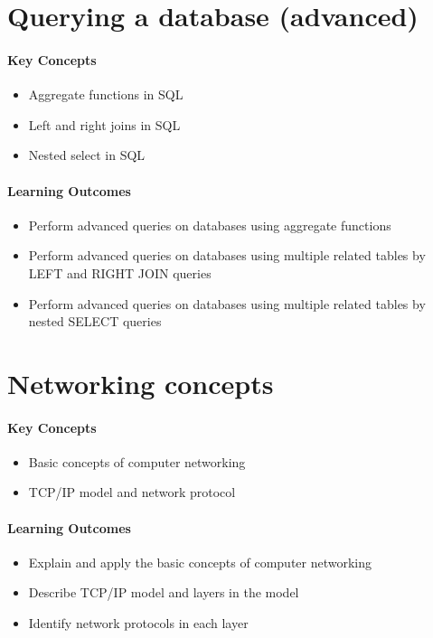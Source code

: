 \section{Querying a database (advanced)}

\begin{mdframed}

\paragraph{Key Concepts}
\begin{itemize}[label={\checkmark}]
\item Aggregate functions in SQL
\item Left and right joins in SQL
\item Nested select in SQL
\end{itemize}

\paragraph{Learning Outcomes}
\begin{itemize}[label={\checkmark}]
\item Perform advanced queries on databases using aggregate functions
\item Perform advanced queries on databases using multiple related tables by LEFT and RIGHT JOIN queries
\item Perform advanced queries on databases using multiple related tables by nested SELECT queries
\end{itemize}
\end{mdframed}

\section{Networking concepts}

\begin{mdframed}

\paragraph{Key Concepts}
\begin{itemize}[label={\checkmark}]
\item Basic concepts of computer networking
\item TCP/IP model and network protocol
\end{itemize}

\paragraph{Learning Outcomes}
\begin{itemize}[label={\checkmark}]
\item Explain and apply the basic concepts of computer networking
\item Describe TCP/IP model and layers in the model 
\item Identify network protocols in each layer
\end{itemize}
\end{mdframed}



